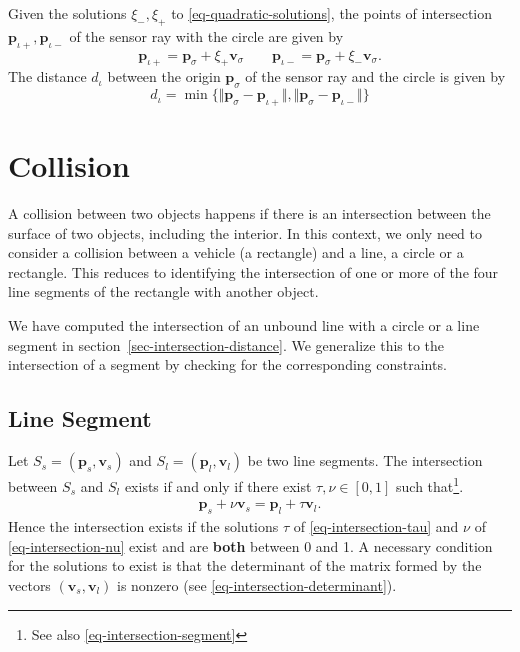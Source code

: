 \documentclass[11pt]{article}
\newcommand{\diota}{d_\iota}
\newcommand{\pbl}{\mathbf{p}_l}
\newcommand{\pbs}{\mathbf{p}_s}
\newcommand{\pbiotp}{\mathbf{p}_{\iota+}}
\newcommand{\pbiotm}{\mathbf{p}_{\iota-}}
\newcommand{\pbsig}{\mathbf{p}_\sigma}
\newcommand{\vbl}{\mathbf{v}_l}
\newcommand{\vbs}{\mathbf{v}_s}
\newcommand{\vbsig}{\mathbf{v}_\sigma}
\begin{document}
Given the solutions $\xi_-,\xi_+$ to \eqref{eq-quadratic-solutions}, the points
of intersection  $\pbiotp,\pbiotm$ of the sensor ray with the circle are given 
by
\begin{equation}
    \pbiotp=\pbsig + \xi_+\vbsig\qquad\pbiotm=\pbsig + \xi_-\vbsig.
\end{equation}
The distance $\diota$ between the origin $\pbsig$ of the sensor ray and the
circle is given by
\begin{equation}
    \diota = \min\{\Vert\pbsig-\pbiotp\Vert,\Vert\pbsig-\pbiotm\Vert\}
    \label{eq-distance-circle}
\end{equation}


\section{Collision}
\label{sec-collision}

A collision between two objects happens if there is an intersection between the
surface of two objects, including the interior. In this context, we only need 
to consider a collision between a vehicle (a rectangle) and a line, a circle 
or a rectangle. This reduces to identifying the intersection of one or more 
of the four line segments of the rectangle with another object. 

We have computed the intersection of an unbound line with a circle or a
line segment in section~\ref{sec-intersection-distance}. We generalize this to
the intersection of a segment by checking for the corresponding constraints.

\subsection{Line Segment}
\label{sec-collision-line-segment}

Let $S_s=(\pbs,\vbs)$ and $S_l=(\pbl,\vbl)$ be two line segments. The 
intersection between $S_s$ and $S_l$ exists if and only if there exist
$\tau,\nu\in[0,1]$ such that\footnote{See also
\eqref{eq-intersection-segment}}.
\begin{eqnarray}
    \pbs + \nu \vbs = \pbl + \tau \vbl. \label{eq-collision-segment}
\end{eqnarray}
Hence the intersection exists if the solutions 
$\tau$ of \eqref{eq-intersection-tau} and $\nu$ of \eqref{eq-intersection-nu}
exist and are \textbf{both} between 0 and 1. A necessary condition for the
solutions to exist is that the determinant of the matrix formed by the vectors
$(\vbs,\vbl)$ is nonzero (see \eqref{eq-intersection-determinant}). 
\end{document}
